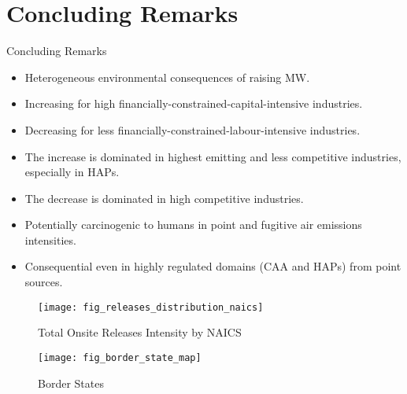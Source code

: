 \documentclass[aspectratio = 169]{beamer}
\begin{document}
    \section{Concluding Remarks}\label{sec:concluding-remarks}
    \begin{frame}{Concluding Remarks}
        \begin{itemize}
            \item Heterogeneous environmental consequences of raising MW.
            \item Increasing for high financially-constrained-capital-intensive industries.
            \item Decreasing for less financially-constrained-labour-intensive industries.
            \item The increase is dominated in highest emitting and less competitive industries, especially in HAPs.
            \item The decrease is dominated in high competitive industries.
            \item Potentially carcinogenic to humans in point and fugitive air emissions intensities.
            \item Consequential even in highly regulated domains (CAA and HAPs) from point sources.
        \end{itemize}
    \end{frame}
    \begin{frame}
        \hypertarget{fig:distribution-releases-intensity}{}
        \begin{figure}
            \centering
            \texttt{[image: fig\_releases\_distribution\_naics]}
            \caption{Total Onsite Releases Intensity by NAICS}
            \label{fig:distribution-releases-intensity}
        \end{figure}
        \hyperlink{Distribution Releases Intensity}{}
        \fontsize{9}{11}\selectfont
    \end{frame}

    \begin{frame}
        \hypertarget{fig:border-states}{}
        \begin{figure}
            \centering
            \texttt{[image: fig\_border\_state\_map]}
            \caption{Border States}
            \label{fig:border-state-map}
        \end{figure}
        \hyperlink{Border States}{}
        \fontsize{9}{11}\selectfont
    \end{frame}
\end{document}
